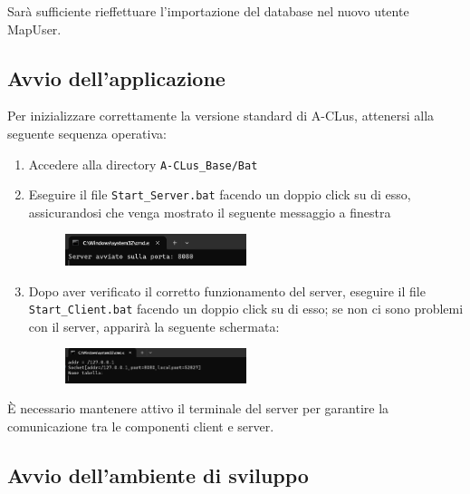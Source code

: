 Sarà sufficiente rieffettuare l'importazione del database nel nuovo utente MapUser.

\subsection*{Avvio dell'applicazione}

Per inizializzare correttamente la versione standard di A-CLus, attenersi alla seguente sequenza operativa:


\begin{enumerate}
    \item Accedere alla directory \texttt{A-CLus\_Base/Bat}
    \item Eseguire il file \texttt{Start\_Server.bat} facendo un doppio click su di esso, assicurandosi che venga mostrato il seguente messaggio a finestra
    
    \begin{figure}[h!]
        \centering
        \includegraphics[width=0.5\textwidth]{images/server in esecuzione.png}
    \end{figure}

    \item Dopo aver verificato il corretto funzionamento del server, eseguire il file \texttt{Start\_Client.bat} facendo un doppio click su di esso; se non ci sono problemi con il server, apparirà la seguente schermata:
    
    \begin{figure}[h!]
        \centering
        \includegraphics[width=0.5\textwidth]{images/client in esecuzione.png}
        
    \end{figure}
    
\end{enumerate}

\begin{tcolorbox}[colback=white, colframe=gray, title=Avvertenza]
    È necessario mantenere attivo il terminale del server per garantire la comunicazione tra le componenti client e server.
\end{tcolorbox}

\subsection*{Avvio dell'ambiente di sviluppo}

